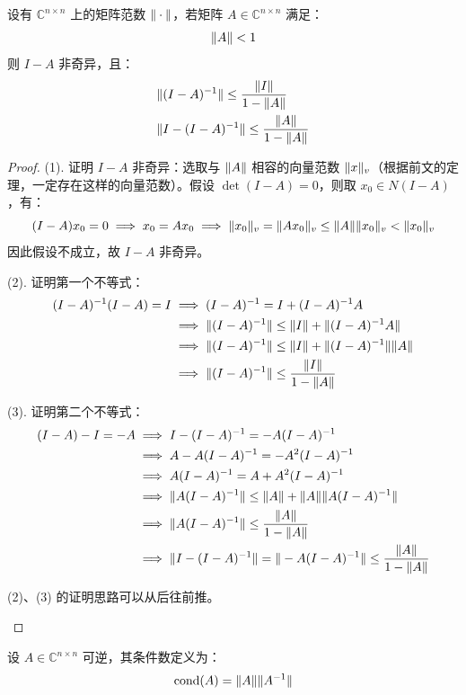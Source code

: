 \begin{theorem}
设有 $\mathbb C^{n\times n}$ 上的矩阵范数 $\Vert\cdot\Vert$，若矩阵 $A\in\mathbb C^{n\times n}$ 满足：
\[\Vert A\Vert<1\]
则 $I-A$ 非奇异，且：
\begin{align*}
    &\Vert(I-A)^{-1}\Vert\leq\frac{\Vert I\Vert}{1-\Vert A\Vert}\\
    &\Vert I-(I-A)^{-1}\Vert\leq\frac{\Vert A\Vert}{1-\Vert A\Vert}
\end{align*}
\end{theorem}
\begin{proof}
(1). 证明 $I-A$ 非奇异：选取与 $\Vert A\Vert$ 相容的向量范数 $\Vert x\Vert_v$（根据前文的定理，一定存在这样的向量范数）。假设 $\det(I-A)=0$，则取 $x_0\in N(I-A)$，有：
\[
    (I-A)x_0=0\implies x_0=Ax_0\implies\Vert x_0\Vert_v=\Vert Ax_0\Vert_v\leq\Vert A\Vert\Vert x_0\Vert_v<\Vert x_0\Vert_v
\]
因此假设不成立，故 $I-A$ 非奇异。

(2). 证明第一个不等式：
\begin{align*}
    (I-A)^{-1}(I-A)=I&\implies(I-A)^{-1}=I+(I-A)^{-1}A\\
    &\implies\Vert(I-A)^{-1}\Vert\leq\Vert I\Vert+\Vert(I-A)^{-1}A\Vert\\
    &\implies\Vert(I-A)^{-1}\Vert\leq\Vert I\Vert+\Vert(I-A)^{-1}\Vert\Vert A\Vert\\
    &\implies\Vert(I-A)^{-1}\Vert\leq\frac{\Vert I\Vert}{1-\Vert A\Vert}\\
\end{align*}

(3). 证明第二个不等式：
\begin{align*}
    (I-A)-I=-A&\implies I-(I-A)^{-1}=-A(I-A)^{-1}\\
    &\implies A-A(I-A)^{-1}=-A^2(I-A)^{-1}\\
    &\implies A(I-A)^{-1}=A+A^2(I-A)^{-1}\\
    &\implies\Vert A(I-A)^{-1}\Vert\leq\Vert A\Vert+\Vert A\Vert\Vert A(I-A)^{-1}\Vert\\
    &\implies\Vert A(I-A)^{-1}\Vert\leq\frac{\Vert A\Vert}{1-\Vert A\Vert}\\
    &\implies\Vert I-(I-A)^{-1}\Vert=\Vert-A(I-A)^{-1}\Vert\leq\frac{\Vert A\Vert}{1-\Vert A\Vert}
\end{align*}
\begin{com}
(2)、(3) 的证明思路可以从后往前推。
\end{com}
\end{proof}

\begin{definition}[条件数]
设 $A\in\mathbb C^{n\times n}$ 可逆，其条件数定义为：
\[
    \text{cond}(A)=\Vert A\Vert\Vert A^{-1}\Vert
\]
\end{definition}

